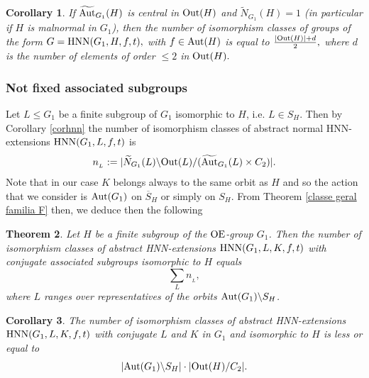 \documentclass[a4paper,12pt]{article}
\newtheorem{thm}{Theorem}[section]
\newtheorem{cor}[thm]{Corollary}
\def\OE{{\rm OE}}
\def\aut {{\rm Aut}}
\def\out {{\rm Out}}
\def\hnn {{\rm HNN}}
\begin{document}
{\begin{cor} \label{malnormal} 
If $\widetilde{\aut}_{G_1}(H)$ is central in $\out(H)$ and $\widetilde{N}_{G_1}(H)=1$ (in particular if $H$ is malnormal in $G_1$), then the number  of isomorphism classes of groups of the form $G = \hnn(G_1, H, f, t),$ with
$f \in \aut(H)$ is equal to $\frac{|\out(H)| +d}{2},$ where $d$ is the number of elements of order $\leq 2$ in $\out(H).$ 
\end{cor}




\subsubsection{Not fixed associated subgroups}

Let $L\leq G_1$ be a finite subgroup of $G_1$ isomorphic to $H$, i.e. $L \in S_H.$ Then by  Corollary \ref{corhnn} the number of isomorphism classes of abstract normal HNN-extensions  $\hnn(G_1, L, f, t)$ is  $$n_{_{L}}:=| \widetilde{N}_{G_1}(L) \backslash \out(L)/ ( \widetilde{\aut}_{G_1}(L) \times C_2) |.$$ Note that in our case $K$ belongs always to the same orbit as $H$ and so the action that we consider is $\aut(G_1)$  on $\overline S_H$ or simply on $S_H$. From Theorem \ref{classe geral familia F} then, we deduce then the following  



\begin{thm} Let $H$  be  a finite subgroup of the $\OE$-group $G_1$. Then the number of isomorphism classes of abstract HNN-extensions $\hnn(G_1, L, K, f, t)$ with conjugate associated subgroups isomorphic to $H$ equals $$\sum_{L} n_{_{L}},$$ where $L$ ranges over representatives of the orbits  $\aut(G_1)\backslash S_H$.
\end{thm}




\begin{cor} The number of isomorphism classes of abstract HNN-extensions $\hnn(G_1, L, K, f, t)$ with conjugate $L$ and $K$   in $G_1$ and isomorphic to $H$ is less or  equal to $$|\aut(G_1)\backslash {S}_H| \cdot |\out(H)/C_2|.$$
\end{cor}

}
\end{document}

